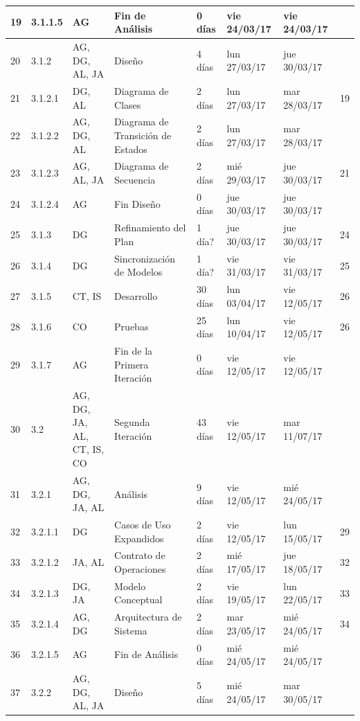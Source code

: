 \begin{center}
\begin{longtable}{  p{0.5cm}  p{1cm}  p{2cm}  p{4cm}  p{1.5cm}  p{2cm}  p{2cm}  p{2cm}  }
19	&	3.1.1.5	&	AG	&	         Fin de Análisis	&	0 días	&	vie 24/03/17	&	vie 24/03/17	&		\\ \hline
20	&	3.1.2	&	AG, DG, AL, JA	&	      Diseño	&	4 días	&	lun 27/03/17	&	jue 30/03/17	&		\\ \hline
21	&	3.1.2.1	&	DG, AL	&	         Diagrama de Clases	&	2 días	&	lun 27/03/17	&	mar 28/03/17	&	19	\\ \hline
22	&	3.1.2.2	&	AG, DG, AL	&	         Diagrama de Transición de Estados	&	2 días	&	lun 27/03/17	&	mar 28/03/17	&		\\ \hline
23	&	3.1.2.3	&	AG, AL, JA	&	         Diagrama de Secuencia	&	2 días	&	mié 29/03/17	&	jue 30/03/17	&	21	\\ \hline
24	&	3.1.2.4	&	AG	&	         Fin Diseño	&	0 días	&	jue 30/03/17	&	jue 30/03/17	&		\\ \hline
25	&	3.1.3	&	DG	&	      Refinamiento del Plan	&	1 día?	&	jue 30/03/17	&	jue 30/03/17	&	24	\\ \hline
26	&	3.1.4	&	DG	&	      Sincronización de Modelos	&	1 día?	&	vie 31/03/17	&	vie 31/03/17	&	25	\\ \hline
27	&	3.1.5	&	CT, IS	&	      Desarrollo	&	30 días	&	lun 03/04/17	&	vie 12/05/17	&	26	\\ \hline
28	&	3.1.6	&	CO	&	      Pruebas	&	25 días	&	lun 10/04/17	&	vie 12/05/17	&	26	\\ \hline
29	&	3.1.7	&	AG	&	      Fin de la Primera Iteración	&	0 días	&	vie 12/05/17	&	vie 12/05/17	&		\\ \hline
30	&	3.2	&	AG, DG, JA, AL, CT, IS, CO	&	   Segunda Iteración	&	43 días	&	vie 12/05/17	&	mar 11/07/17	&		\\ \hline
31	&	3.2.1	&	AG, DG, JA, AL	&	      Análisis	&	9 días	&	vie 12/05/17	&	mié 24/05/17	&		\\ \hline
32	&	3.2.1.1	&	DG	&	         Casos de Uso Expandidos	&	2 días	&	vie 12/05/17	&	lun 15/05/17	&	29	\\ \hline
33	&	3.2.1.2	&	JA, AL	&	         Contrato de Operaciones	&	2 días	&	mié 17/05/17	&	jue 18/05/17	&	32	\\ \hline
34	&	3.2.1.3	&	DG, JA	&	         Modelo Conceptual	&	2 días	&	vie 19/05/17	&	lun 22/05/17	&	33	\\ \hline
35	&	3.2.1.4	&	AG, DG	&	         Arquitectura de Sistema	&	2 días	&	mar 23/05/17	&	mié 24/05/17	&	34	\\ \hline
36	&	3.2.1.5	&	AG	&	         Fin de Análisis	&	0 días	&	mié 24/05/17	&	mié 24/05/17	&		\\ \hline
37	&	3.2.2	&	AG, DG, AL, JA	&	      Diseño	&	5 días	&	mié 24/05/17	&	mar 30/05/17	&		\\ \hline

\end{longtable}
\end{center}
